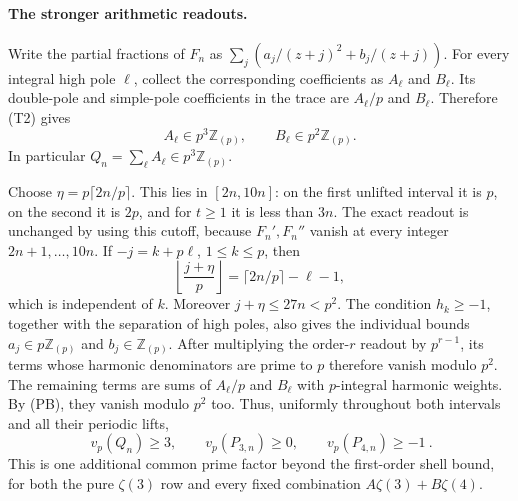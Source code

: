 \documentclass[11pt]{article}
\begin{document}
\paragraph{The stronger arithmetic readouts.}
Write the partial fractions of $F_n$ as
$\sum_j(a_j/(z+j)^2+b_j/(z+j))$.
For every integral high pole $\ell$, collect the corresponding
coefficients as $A_\ell$ and $B_\ell$.  Its double-pole and simple-pole
coefficients in the trace are $A_\ell/p$ and $B_\ell$.  Therefore (T2)
gives
\[
               A_\ell\in p^3\mathbb Z_{(p)},\qquad
               B_\ell\in p^2\mathbb Z_{(p)}.           \tag{PB}
\]
In particular $Q_n=\sum_\ell A_\ell\in p^3\mathbb Z_{(p)}$.

Choose $\eta=p\lceil2n/p\rceil$.  This lies in $[2n,10n]$: on the first
unlifted interval it is $p$, on the second it is $2p$, and for $t\ge1$ it
is less than $3n$.  The exact readout is unchanged by using this cutoff,
because $F_n',F_n''$ vanish at every integer $2n+1,\ldots,10n$.
If $-j=k+p\ell$, $1\le k\le p$, then
\[
 \left\lfloor\frac{j+\eta}{p}\right\rfloor
                 =\lceil2n/p\rceil-\ell-1,
\]
which is independent of $k$.  Moreover $j+\eta\le27n<p^2$.
The condition $h_k\ge-1$, together with the separation of high poles,
also gives the individual bounds $a_j\in p\mathbb Z_{(p)}$ and
$b_j\in\mathbb Z_{(p)}$.  After multiplying the order-$r$ readout by
$p^{r-1}$, its terms whose harmonic denominators are prime to $p$
therefore vanish modulo $p^2$.
The remaining terms are sums of $A_\ell/p$ and $B_\ell$ with
$p$-integral harmonic weights.  By (PB), they vanish modulo $p^2$ too.
Thus, uniformly throughout both intervals and all their periodic lifts,
\[
 \boxed{\ v_p(Q_n)\ge3,\qquad v_p(P_{3,n})\ge0,\qquad
                              v_p(P_{4,n})\ge-1\ }.    \tag{SG}
\]
This is one additional common prime factor beyond the first-order shell
bound, for both the pure $\zeta(3)$ row and every fixed combination
$A\zeta(3)+B\zeta(4)$.
\end{document}
